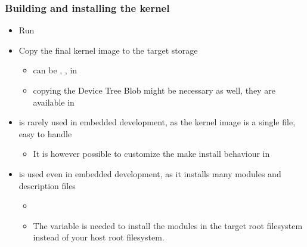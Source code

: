 \begin{frame}
  \frametitle{Building and installing the kernel}
  \begin{itemize}
  \item Run 
  \item Copy the final kernel image to the target storage
    \begin{itemize}
    \item can be , ,
       in 
    \item copying the Device Tree Blob might be necessary as well,
      they are available in 
    \end{itemize}
  \item {} is rarely used in embedded development, as the
    kernel image is a single file, easy to handle
    \begin{itemize}
    \item It is however possible to customize the make install
      behaviour in 
    \end{itemize}
  \item {} is used even in embedded
    development, as it installs many modules and description files
    \begin{itemize}
    \item {}
    \item The  variable is needed to install
      the modules in the target root filesystem instead of your host
      root filesystem.
    \end{itemize}
  \end{itemize}
\end{frame}

